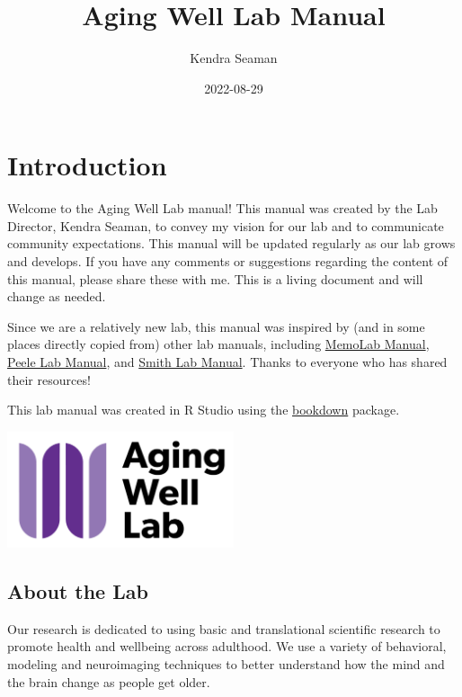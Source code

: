 \documentclass[
]{book}
\title{Aging Well Lab Manual}
\author{Kendra Seaman}
\date{2022-08-29}
\begin{document}
\maketitle

{
\setcounter{tocdepth}{1}
\tableofcontents
}
\hypertarget{introduction}{%
\chapter{Introduction}\label{introduction}}

Welcome to the Aging Well Lab manual! This manual was created by the Lab Director, Kendra Seaman, to convey my vision for our lab and to communicate community expectations. This manual will be updated regularly as our lab grows and develops. If you have any comments or suggestions regarding the content of this manual, please share these with me. This is a living document and will change as needed.

Since we are a relatively new lab, this manual was inspired by (and in some places directly copied from) other lab manuals, including \href{https://github.com/memobc/memolab-manual}{MemoLab Manual}, \href{http://jpeelle.net/peellelab_manual.pdf}{Peele Lab Manual}, and \href{https://github.com/DVSneuro/smithlab_manual/blob/master/SmithLab_manual.pdf}{Smith Lab Manual}. Thanks to everyone who has shared their resources!

This lab manual was created in R Studio using the \href{https://bookdown.org/yihui/bookdown/}{bookdown} package.

\includegraphics[width=0.5\textwidth,height=\textheight]{images/awl.png}

\hypertarget{about-the-lab}{%
\section{About the Lab}\label{about-the-lab}}

Our research is dedicated to using basic and translational scientific research to promote health and wellbeing across adulthood. We use a variety of behavioral, modeling and neuroimaging techniques to better understand how the mind and the brain change as people get older.
\end{document}
